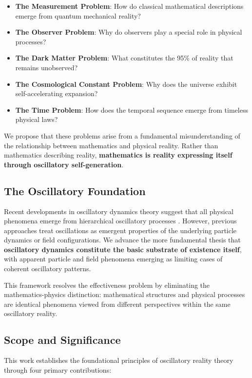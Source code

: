 \documentclass[11pt]{article}
\theoremstyle{remark}
\begin{document}
\begin{itemize}
\item \textbf{The Measurement Problem}: How do classical mathematical descriptions emerge from quantum mechanical reality?
\item \textbf{The Observer Problem}: Why do observers play a special role in physical processes?
\item \textbf{The Dark Matter Problem}: What constitutes the 95\% of reality that remains unobserved?
\item \textbf{The Cosmological Constant Problem}: Why does the universe exhibit self-accelerating expansion?
\item \textbf{The Time Problem}: How does the temporal sequence emerge from timeless physical laws?
\end{itemize}

We propose that these problems arise from a fundamental misunderstanding of the relationship between mathematics and physical reality. Rather than mathematics describing reality, \textbf{mathematics is reality expressing itself through oscillatory self-generation}.

\subsection{The Oscillatory Foundation}

Recent developments in oscillatory dynamics theory suggest that all physical phenomena emerge from hierarchical oscillatory processes \cite{kuramoto1984chemical,strogatz2018nonlinear}. However, previous approaches treat oscillations as emergent properties of the underlying particle dynamics or field configurations. We advance the more fundamental thesis that \textbf{oscillatory dynamics constitute the basic substrate of existence itself}, with apparent particle and field phenomena emerging as limiting cases of coherent oscillatory patterns.

This framework resolves the effectiveness problem by eliminating the mathematics-physics distinction: mathematical structures and physical processes are identical phenomena viewed from different perspectives within the same oscillatory reality.

\subsection{Scope and Significance}

This work establishes the foundational principles of oscillatory reality theory through four primary contributions:
\end{document}
